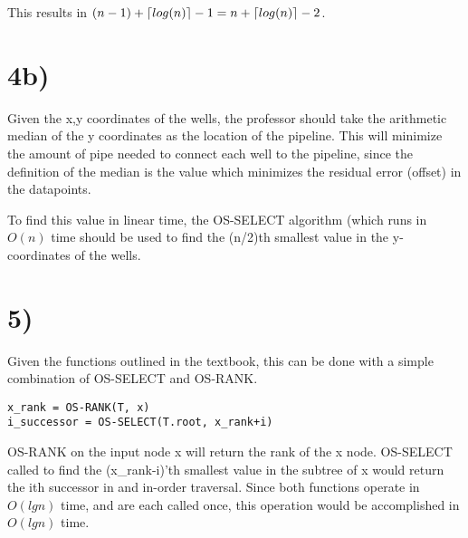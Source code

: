 \documentclass[a4paper,11pt]{article}
\DeclarePairedDelimiter{\ceil}{\lceil}{\rceil}
\begin{document}
This results in $(n-1) + \ceil{log(n)} -1 = n + \ceil{log(n)} - 2$.

\begin{center}
\end{center}

\section*{4b)}
Given the x,y coordinates of the wells, the professor should take the 
arithmetic median of the y coordinates as the location of the pipeline.  This 
will minimize the amount of pipe needed to connect each well to the pipeline,
since the definition of the median is the value which minimizes the residual
error (offset) in the datapoints. 

To find this value in linear time, the OS-SELECT algorithm (which runs in $O(n)$ 
time should be used to find
the (n/2)th smallest value in the y-coordinates of the wells. 


\section*{5)}
Given the functions outlined in the textbook, this can be 
done with a simple combination of OS-SELECT and OS-RANK.

\begin{verbatim}
x_rank = OS-RANK(T, x)
i_successor = OS-SELECT(T.root, x_rank+i)
\end{verbatim}

OS-RANK on the input node x will return the rank of the x
node.  OS-SELECT called to find the (x\_rank-i)'th smallest
value in the subtree of x would return the ith successor in 
and in-order traversal.  Since both functions operate in
$O(lg n)$ time, and are each called once, this operation 
would be accomplished in $O(lg n)$ time.
\end{document}

